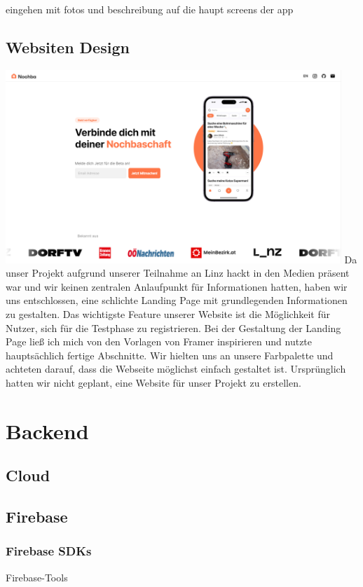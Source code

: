 eingehen mit fotos und beschreibung auf die haupt screens der app

\subsection{Websiten Design}
\includegraphics[width=0.95\textwidth]{pics/website-design.png}
Da unser Projekt aufgrund unserer Teilnahme an Linz hackt in den Medien präsent war und wir keinen zentralen Anlaufpunkt für Informationen hatten, haben wir uns entschlossen, eine schlichte Landing Page mit grundlegenden Informationen zu gestalten. Das wichtigste Feature unserer Website ist die Möglichkeit für Nutzer, sich für die Testphase zu registrieren. Bei der Gestaltung der Landing Page ließ ich mich von den Vorlagen von Framer inspirieren und nutzte hauptsächlich fertige Abschnitte. Wir hielten uns an unsere Farbpalette und achteten darauf, dass die Webseite möglichst einfach gestaltet ist. Ursprünglich hatten wir nicht geplant, eine Website für unser Projekt zu erstellen.

\section{Backend}
\subsection{Cloud}
\author{Martin Hausleitner}

\subsection{Firebase}
\author{Martin Hausleitner}

\subsubsection{Firebase SDKs}
\author{Sandin Habibovic}
Firebase-Tools


